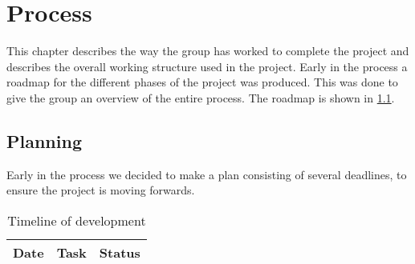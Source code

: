 
\chapter{Process}
This chapter describes the way the group has worked to complete the project and describes the overall working structure used in the project.
Early in the process a roadmap for the different phases of the project was produced. This was done to give the group an overview of the entire process. The roadmap is shown in \cref{tab:timeline}.

\section{Planning}
Early in the process we decided to make a plan consisting of several deadlines, to ensure the project is moving forwards.

\begin{table}[H]
	\begin{tabularx}{\textwidth}{l X X}
		\toprule
		Date & Task & Status \\
		\midrule
		\bottomrule
	\end{tabularx}
	\caption{Timeline of development}
	\label{tab:timeline}
\end{table}